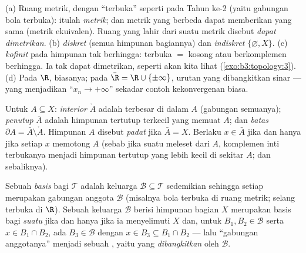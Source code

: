 \begin{example}\label{ex:b3:topology:examples}
(a) Ruang metrik, dengan ``terbuka'' seperti pada Tahun ke-2 (yaitu gabungan bola
terbuka): itulah \emph{ metrik}; dan metrik yang berbeda dapat memberikan
 yang sama (metrik ekuivalen). Ruang yang 
lahir dari suatu metrik disebut \emph{dapat dimetrikan}.
(b)  \emph{diskret} (semua himpunan bagiannya) dan
 \emph{indiskret} $\{\varnothing, X\}$.
(c)  \emph{kofinit} pada himpunan tak berhingga: terbuka $=$
kosong atau berkomplemen berhingga. Ia tak dapat dimetrikan, seperti akan kita lihat
(\cref{exo:b3:topology:3}).
(d) Pada $\R$,  biasanya; pada $\bar\R = \R \cup
\{\pm\infty\}$,  urutan yang dibangkitkan sinar --- yang menjadikan
``$x_n \to +\infty$'' sekadar contoh kekonvergenan biasa.
\end{example}

\begin{definition}\label{def:b3:topology:interior}
Untuk $A \subseteq X$: \emph{interior} $\mathring A$ adalah
 terbesar di dalam $A$ (gabungan semuanya);
\emph{penutup} $\bar A$ adalah himpunan tertutup terkecil
yang memuat $A$; dan \emph{batas} $\partial A = \bar A
\setminus \mathring A$. Himpunan $A$ disebut \emph{padat} jika
$\bar A = X$. Berlaku $x \in \bar A$ jika dan hanya jika setiap 
$x$ memotong $A$ (sebab jika suatu  meleset dari $A$, komplemen inti
terbukanya menjadi himpunan tertutup yang lebih kecil di sekitar $A$; dan sebaliknya).
\end{definition}

\begin{definition}\label{def:b3:topology:basis}
Sebuah \emph{basis} bagi $\mathcal T$ adalah
keluarga $\mathcal B \subseteq \mathcal T$ sedemikian sehingga setiap  merupakan gabungan anggota $\mathcal B$ (misalnya bola terbuka di
ruang metrik; selang terbuka di $\R$). Sebuah keluarga $\mathcal B$ berisi
himpunan bagian $X$ merupakan basis bagi \emph{suatu}  jika dan hanya jika ia menyelimuti
$X$ dan, untuk $B_1, B_2 \in \mathcal B$ serta $x \in B_1 \cap B_2$,
ada $B_3 \in \mathcal B$ dengan $x \in B_3 \subseteq B_1\cap B_2$
--- lalu ``gabungan anggotanya'' menjadi sebuah , yaitu 
yang \emph{dibangkitkan} oleh $\mathcal B$.
\end{definition}

